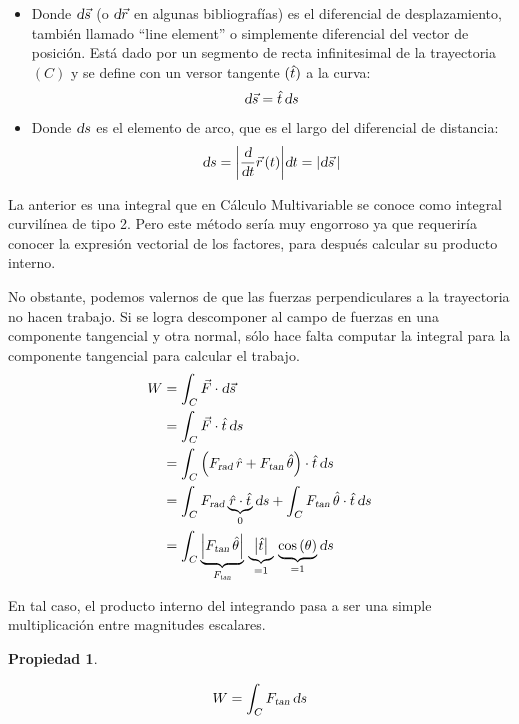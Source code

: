 \documentclass[a5paper,12pt,twoside]{book}
\newtheorem{prop}{{Propiedad}}[chapter]
\begin{document}
\begin{itemize}
    \item
    Donde $\textsl{d} \Vec{s}$ (o $\textsl{d} \Vec{r}$ en algunas bibliografías) es el diferencial de desplazamiento, también llamado ``line element'' o simplemente diferencial del vector de posición.
    Está dado por un segmento de recta infinitesimal de la trayectoria $(C)$ y se define con un versor tangente $(\hat{t})$ a la curva:
    \[ \textsl{d} \Vec{s} = \hat{t} \, \textsl{d} s \]
    
    \item Donde $\textsl{d} s$ es el elemento de arco, que es el largo del diferencial de distancia:
    \[
      \textsl{d} s = {\left| {\dfrac{\textsl{d}}{\textsl{d} t} \vec{r}\hspace{0.05cm}(t)} \right|} \textsl{d} t  = {\left| {\textsl{d} \Vec{s} \,} \right|}
    \]
\end{itemize}

La anterior es una integral que en Cálculo Multivariable se conoce como integral curvilínea de tipo 2.
Pero este método sería muy engorroso ya que requeriría conocer la expresión vectorial de los factores, para después calcular su producto interno.

No obstante, podemos valernos de que las fuerzas perpendiculares a la trayectoria no hacen trabajo.
Si se logra descomponer al campo de fuerzas en una componente tangencial y otra normal, sólo hace falta computar la integral para la componente tangencial para calcular el trabajo.
\begin{align*}
    W &= \int_C \Vec{F} \cdot \textsl{d} \Vec{s}
    \\
    &= \int_C \Vec{F} \cdot \hat{t} \, \textsl{d} s
    \\
    &= \int_C \left({{F}_\textsl{{rad}}} \, \hat{r} + {{F}_\textsl{{tan}}} \, \hat{\theta}\right) \cdot \hat{t} \, \textsl{d} s
    \\
    &= \int_C {{F}_\textsl{{rad}}} \underbrace{\hat{r} \cdot \hat{t}}_0 \textsl{d} s
    + \int_C {{F}_\textsl{{tan}}} \, \hat{\theta} \cdot \hat{t} \, \textsl{d} s
    \\
    &= \int_C \underbrace{{\left| {{{F}_\textsl{{tan}}} \, \hat{\theta}} \right|}}_{{{F}_\textsl{{tan}}}} \, \underbrace{{\left| {\hat{t}} \right|}}_{=1} \, \underbrace{\cos{(\theta)}}_{=1} \textsl{d} s
\end{align*}

En tal caso, el producto interno del integrando pasa a ser una simple multiplicación entre magnitudes escalares.

\begin{mdframed}[style=MyFrame1]
    \begin{prop}
    \end{prop}
    \begin{equation*}
        W = \int_C {{F}_\textsl{{tan}}} \, \textsl{d} s
    \end{equation*}
\end{mdframed}
\end{document}
